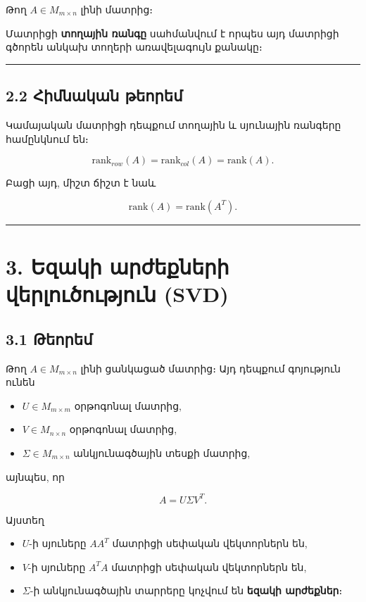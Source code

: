 \documentclass[12pt, a4paper]{article}
\begin{document}
Թող \(A \in M_{m\times n}\) լինի մատրից։

Մատրիցի \textbf{տողային ռանգը} սահմանվում է որպես այդ մատրիցի գծորեն անկախ տողերի առավելագույն քանակը։

\vspace{1em}
\hrule
\vspace{1em}

\subsection{2.2 Հիմնական թեորեմ}

Կամայական մատրիցի դեպքում տողային և սյունային ռանգերը համընկնում են։

$$
\text{rank}_{row}(A) = \text{rank}_{col}(A) = \text{rank}(A).
$$

Բացի այդ, միշտ ճիշտ է նաև

$$
\text{rank}(A) = \text{rank}(A^T).
$$

\vspace{1em}
\hrule
\vspace{1em}

\section{3. Եզակի արժեքների վերլուծություն (SVD)}

\subsection{3.1 Թեորեմ}

Թող \(A \in M_{m\times n}\) լինի ցանկացած մատրից։ Այդ դեպքում գոյություն ունեն

\begin{itemize}
    \item \(U \in M_{m\times m}\) օրթոգոնալ մատրից,
    \item \(V \in M_{n\times n}\) օրթոգոնալ մատրից,
    \item \(\Sigma \in M_{m\times n}\) անկյունագծային տեսքի մատրից,
\end{itemize}

այնպես, որ

$$
A = U \Sigma V^T.
$$

Այստեղ

\begin{itemize}
    \item \(U\)-ի սյուները \(AA^T\) մատրիցի սեփական վեկտորներն են,
    \item \(V\)-ի սյուները \(A^TA\) մատրիցի սեփական վեկտորներն են,
    \item \(\Sigma\)-ի անկյունագծային տարրերը կոչվում են \textbf{եզակի արժեքներ}։
\end{itemize}
\end{document}
